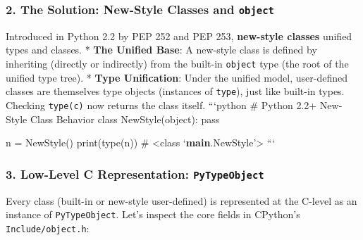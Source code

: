 \hypertarget{the-solution-new-style-classes-and-object}{%
\subsubsection{\texorpdfstring{2. The Solution: New-Style Classes and
\texttt{object}}{2. The Solution: New-Style Classes and object}}\label{the-solution-new-style-classes-and-object}}

Introduced in Python 2.2 by PEP 252 and PEP 253, \textbf{new-style
classes} unified types and classes. * \textbf{The Unified Base}: A
new-style class is defined by inheriting (directly or indirectly) from
the built-in \passthrough{\lstinline!object!} type (the root of the
unified type tree). * \textbf{Type Unification}: Under the unified
model, user-defined classes are themselves type objects (instances of
\passthrough{\lstinline!type!}), just like built-in types. Checking
\passthrough{\lstinline!type(c)!} now returns the class itself.
```python \# Python 2.2+ New-Style Class Behavior class
NewStyle(object): pass

n = NewStyle() print(type(n)) \# \textless class
`\textbf{main}.NewStyle'\textgreater{} ```

\hypertarget{low-level-c-representation-pytypeobject}{%
\subsubsection{\texorpdfstring{3. Low-Level C Representation:
\texttt{PyTypeObject}}{3. Low-Level C Representation: PyTypeObject}}\label{low-level-c-representation-pytypeobject}}

Every class (built-in or new-style user-defined) is represented at the
C-level as an instance of \passthrough{\lstinline!PyTypeObject!}. Let's
inspect the core fields in CPython's
\passthrough{\lstinline!Include/object.h!}:

